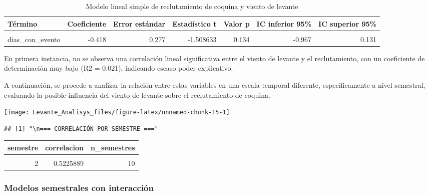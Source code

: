 \documentclass[
]{article}
\begin{document}
\begin{table}[!h]
\centering
\caption{\label{tab:unnamed-chunk-13}Modelo lineal simple de reclutamiento de coquina y viento de levante}
\centering
\begin{tabular}[t]{l|r|r|r|r|r|r}
\hline
Término & Coeficiente & Error estándar & Estadístico t & Valor p & IC inferior 95\% & IC superior 95\%\\
\hline
\cellcolor{gray!10}{(Intercept)} & \cellcolor{gray!10}{24.657} & \cellcolor{gray!10}{2.644} & \cellcolor{gray!10}{9.323810} & \cellcolor{gray!10}{0.000} & \cellcolor{gray!10}{19.413} & \cellcolor{gray!10}{29.901}\\
\hline
dias\_con\_evento & -0.418 & 0.277 & -1.508633 & 0.134 & -0.967 & 0.131\\
\hline
\end{tabular}
\end{table}

En primera instancia, no se observa una correlación lineal significativa entre el viento de levante y el reclutamiento, con un coeficiente de determinación muy bajo (R2 = 0.021), indicando escaso poder explicativo.

A continuación, se procede a analizar la relación entre estas variables en una escala temporal diferente, específicamente a nivel semestral, evaluando la posible influencia del viento de levante sobre el reclutamiento de coquina.

\begin{center}\texttt{[image: Levante\_Analisys\_files/figure-latex/unnamed-chunk-15-1]} \end{center}

\begin{verbatim}
## [1] "\n=== CORRELACIÓN POR SEMESTRE ==="
\end{verbatim}

\begin{table}[!h]
\centering
\begin{tabular}[t]{r|r|r}
\hline
semestre & correlacion & n\_semestres\\
\hline
\cellcolor{gray!10}{1} & \cellcolor{gray!10}{-0.1966243} & \cellcolor{gray!10}{10}\\
\hline
2 & 0.5225889 & 10\\
\hline
\end{tabular}
\end{table}

\subsubsection{Modelos semestrales con interacción}\label{modelos-semestrales-con-interacciuxf3n}
\end{document}
